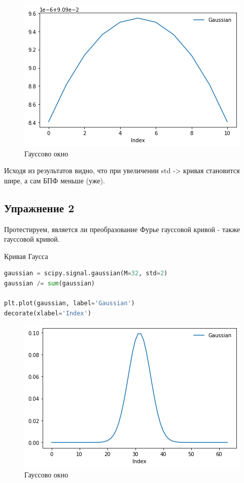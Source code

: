 \begin{figure}[H]
	\begin{center}
		\includegraphics[scale=0.7]{fig/lab08/lab08_03.png}
		\caption{Гауссово окно}
	\end{center}
\end{figure}

Исходя из результатов видно, что при увеличении std -> кривая становится шире, а сам БПФ меньше (уже).


\subsection{Упражнение 2}

Протестируем, является ли преобразование Фурье гауссовой кривой - также гауссовой кривой.

Кривая Гаусса

\begin{lstlisting}[language=Python]
gaussian = scipy.signal.gaussian(M=32, std=2)
gaussian /= sum(gaussian)

plt.plot(gaussian, label='Gaussian')
decorate(xlabel='Index')
\end{lstlisting}

\begin{figure}[H]
	\begin{center}
		\includegraphics[scale=0.7]{fig/lab08/lab08_04.png}
		\caption{Гауссово окно}
	\end{center}
\end{figure}

